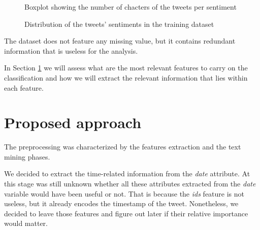 \documentclass[conference]{IEEEtran}
\begin{document}
\begin{figure}[h]
        \centering
        
        \caption{Boxplot showing the number of chacters of the tweets per sentiment}
        \label{fig:charcount}
\end{figure}
\begin{figure}[h]
        \centering
        
        \caption{Distribution of the tweets' sentiments in the training dataset}
        \label{fig:unbalanced}
\end{figure}
The dataset does not feature any missing value, but it contains redundant information that is useless for the analysis.

In Section \ref{sec:approach} we will assess what are the most relevant features to carry on the classification and how we will extract the relevant information that lies within each feature.

\section{Proposed approach}\label{sec:approach}
The preprocessing was characterized by the features extraction and the text mining phases.

We decided to extract the time-related information from the \textit{date} attribute. 
At this stage was still unknown whether all these attributes extracted from the \textit{date} variable would have been useful or not. That is because the \textit{ids} feature is not useless, but it already encodes the timestamp of the tweet. Nonetheless, we decided to leave those features and figure out later if their relative importance would matter.
\end{document}
